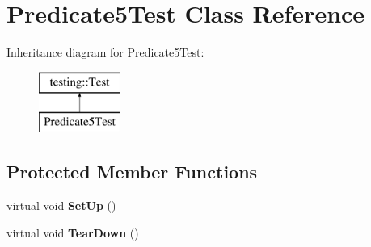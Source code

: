 \hypertarget{class_predicate5_test}{}\section{Predicate5\+Test Class Reference}
\label{class_predicate5_test}
Inheritance diagram for Predicate5\+Test\+:\begin{figure}[H]
\begin{center}
\leavevmode
\includegraphics[height=2.000000cm]{class_predicate5_test}
\end{center}
\end{figure}
\subsection*{Protected Member Functions}
\begin{DoxyCompactItemize}
\item 
\mbox{\label{class_predicate5_test_a42bf622b4f2134d0497cd42fd2e3e1df}} 
virtual void {\bfseries Set\+Up} ()
\item 
\mbox{\label{class_predicate5_test_ab7bc4521d96174d5ef96156edc15444d}} 
virtual void {\bfseries Tear\+Down} ()
\end{DoxyCompactItemize}
